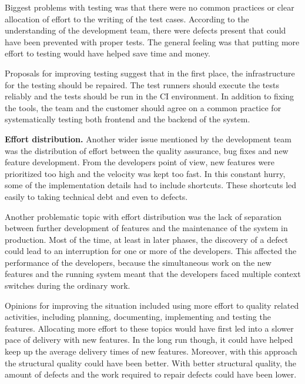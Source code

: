 Biggest problems with testing was that there were no common practices or clear allocation of effort to the writing of the test cases. According to the understanding of the development team, there were defects present that could have been prevented with proper tests. The general feeling was that putting more effort to testing would have helped save time and money.

Proposals for improving testing suggest that in the first place, the infrastructure for the testing should be repaired. The test runners should execute the tests reliably and the tests should be run in the CI environment. In addition to fixing the tools, the team and the customer should agree on a common practice for systematically testing both frontend and the backend of the system.



\textbf{Effort distribution.} Another wider issue mentioned by the development team was the distribution of effort between the quality assurance, bug fixes and new feature development. From the developers point of view, new features were prioritized too high and the velocity was kept too fast. In this constant hurry, some of the implementation details had to include shortcuts. These shortcuts led easily to taking technical debt and even to defects.

Another problematic topic with effort distribution was the lack of separation between further development of features and the maintenance of the system in production. Most of the time, at least in later phases, the discovery of a defect could lead to an interruption for one or more of the developers. This affected the performance of the developers, because the simultaneous work on the new features and the running system meant that the developers faced multiple context switches during the ordinary work.

Opinions for improving the situation included using more effort to quality related activities, including planning, documenting, implementing and testing the features. Allocating more effort to these topics would have first led into a slower pace of delivery with new features. In the long run though, it could have helped keep up the average delivery times of new features. Moreover, with this approach the structural quality could have been better. With better structural quality, the amount of defects and the work required to repair defects could have been lower.

